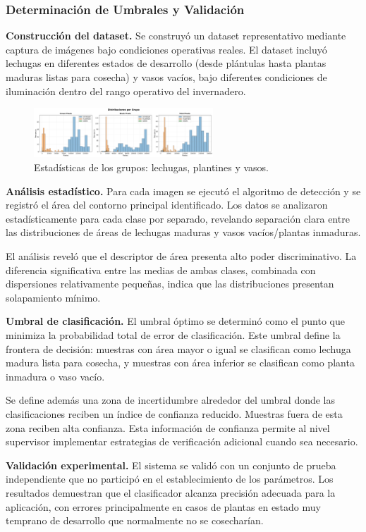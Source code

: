 \subsubsection{Determinación de Umbrales y Validación}

\textbf{Construcción del dataset.} Se construyó un dataset representativo mediante captura de imágenes bajo condiciones operativas reales. El dataset incluyó lechugas en diferentes estados de desarrollo (desde plántulas hasta plantas maduras listas para cosecha) y vasos vacíos, bajo diferentes condiciones de iluminación dentro del rango operativo del invernadero.

\begin{figure}[H]
    \centering
    \includegraphics[width=0.6\textwidth]{img/distribuciones.png}
    \caption{Estadísticas de los grupos: lechugas, plantines y vasos.}
    \label{fig:distribuciones}
\end{figure}

\textbf{Análisis estadístico.} Para cada imagen se ejecutó el algoritmo de detección y se registró el área del contorno principal identificado. Los datos se analizaron estadísticamente para cada clase por separado, revelando separación clara entre las distribuciones de áreas de lechugas maduras y vasos vacíos/plantas inmaduras.

El análisis reveló que el descriptor de área presenta alto poder discriminativo. La diferencia significativa entre las medias de ambas clases, combinada con dispersiones relativamente pequeñas, indica que las distribuciones presentan solapamiento mínimo.

\textbf{Umbral de clasificación.} El umbral óptimo se determinó como el punto que minimiza la probabilidad total de error de clasificación. Este umbral define la frontera de decisión: muestras con área mayor o igual se clasifican como lechuga madura lista para cosecha, y muestras con área inferior se clasifican como planta inmadura o vaso vacío.

Se define además una zona de incertidumbre alrededor del umbral donde las clasificaciones reciben un índice de confianza reducido. Muestras fuera de esta zona reciben alta confianza. Esta información de confianza permite al nivel supervisor implementar estrategias de verificación adicional cuando sea necesario.

\textbf{Validación experimental.} El sistema se validó con un conjunto de prueba independiente que no participó en el establecimiento de los parámetros. Los resultados demuestran que el clasificador alcanza precisión adecuada para la aplicación, con errores principalmente en casos de plantas en estado muy temprano de desarrollo que normalmente no se cosecharían.
